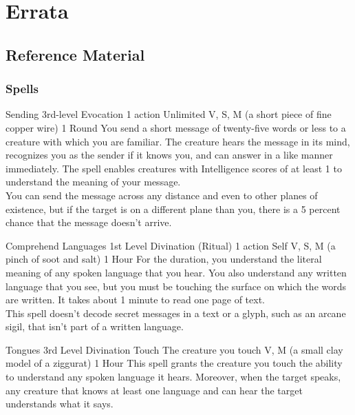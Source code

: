 \documentclass[10pt,twoside,twocolumn,openany,nomultitoc]{book}
\begin{document}
\part{Errata}
\chapter{Reference Material}

\section{Spells}\vspace{6pt}

    \DndSpellHeader%
      {Sending}
      {3rd-level Evocation}
      {1 action}
      {Unlimited}
      {V, S, M (a short piece of fine copper wire)}
      {1 Round}
            You send a short message of twenty-five words or less to a creature with which you are familiar. The creature hears the message in its mind, recognizes you as the sender if it knows you, and can answer in a like manner immediately. The spell enables creatures with Intelligence scores of at least 1 to understand the meaning of your message. \\
            You can send the message across any distance and even to other planes of existence, but if the target is on a different plane than you, there is a 5 percent chance that the message doesn't arrive.
        
    \DndSpellHeader%
      {Comprehend Languages}
      {1st Level Divination (Ritual)}
      {1 action}
      {Self}
      {V, S, M (a pinch of soot and salt)}
      {1 Hour}
    For the duration, you understand the literal meaning of any spoken language that you hear. You also understand any written language that you see, but you must be touching the surface on which the words are written. It takes about 1 minute to read one page of text. \\
    This spell doesn’t decode secret messages in a text or a glyph, such as an arcane sigil, that isn’t part of a written language.        
    
    \DndSpellHeader%
      {Tongues}
      {3rd Level Divination}
      {Touch}
      {The creature you touch}
      {V, M (a small clay model of a ziggurat)}
      {1 Hour}
    This spell grants the creature you touch the ability to understand any spoken language it hears. Moreover, when the target speaks, any creature that knows at least one language and can hear the target understands what it says.
\end{document}
